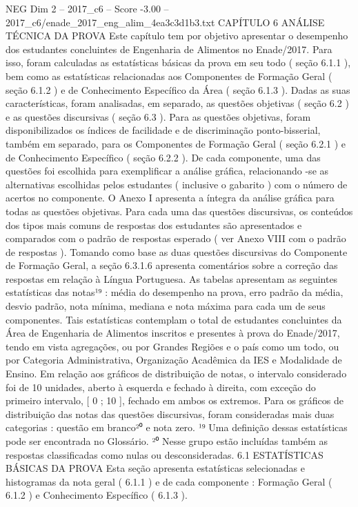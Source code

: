 \begin{textsample}{NEG Dim 2 – 2017\_c6 – Score -3.00 – 2017\_c6/enade\_2017\_eng\_alim\_4ea3c3d1b3.txt}  \label{ex:f2_neg_162}
CAPÍTULO 6 ANÁLISE TÉCNICA DA PROVA Este capítulo tem por objetivo apresentar o desempenho dos estudantes concluintes de Engenharia de Alimentos no Enade/2017.
Para isso, foram calculadas as estatísticas básicas da prova em seu todo ( seção 6.1.1 ), bem como as estatísticas relacionadas aos Componentes de Formação Geral ( seção 6.1.2 ) e de Conhecimento Específico da Área ( seção 6.1.3 ).
Dadas as suas características, foram analisadas, em separado, as questões objetivas ( seção 6.2 ) e as questões discursivas ( seção 6.3 ).
Para as questões objetivas, foram disponibilizados os índices de facilidade e de discriminação ponto-bisserial, também em separado, para os Componentes de Formação Geral ( seção 6.2.1 ) e de Conhecimento Específico ( seção 6.2.2 ).
De cada componente, uma das questões foi escolhida para exemplificar a análise gráfica, relacionando -se as alternativas escolhidas pelos estudantes ( inclusive o gabarito ) com o número de acertos no componente.
O Anexo I apresenta a íntegra da análise gráfica para todas as questões objetivas.
Para cada uma das questões discursivas, os conteúdos dos tipos mais comuns de respostas dos estudantes são apresentados e comparados com o padrão de respostas esperado ( ver Anexo VIII com o padrão de respostas ).
Tomando como base as duas questões discursivas do Componente de Formação Geral, a seção 6.3.1.6 apresenta comentários sobre a correção das respostas em relação à Língua Portuguesa.
As tabelas apresentam as seguintes estatísticas das notas¹⁹ : média do desempenho na prova, erro padrão da média, desvio padrão, nota mínima, mediana e nota máxima para cada um de seus componentes.
Tais estatísticas contemplam o total de estudantes concluintes da Área de Engenharia de Alimentos inscritos e presentes à prova do Enade/2017, tendo em vista agregações, ou por Grandes Regiões e o país como um todo, ou por Categoria Administrativa, Organização Acadêmica da IES e Modalidade de Ensino.
Em relação aos gráficos de distribuição de notas, o intervalo considerado foi de 10 unidades, aberto à esquerda e fechado à direita, com exceção do primeiro intervalo, [ 0 ; 10 ], fechado em ambos os extremos.
Para os gráficos de distribuição das notas das questões discursivas, foram consideradas mais duas categorias : questão em branco²⁰ e nota zero. ¹⁹ Uma definição dessas estatísticas pode ser encontrada no Glossário. ²⁰ Nesse grupo estão incluídas também as respostas classificadas como nulas ou desconsideradas. 6.1 ESTATÍSTICAS BÁSICAS DA PROVA Esta seção apresenta estatísticas selecionadas e histogramas da nota geral ( 6.1.1 ) e de cada componente : Formação Geral ( 6.1.2 ) e Conhecimento Específico ( 6.1.3 ).

\end{textsample}
